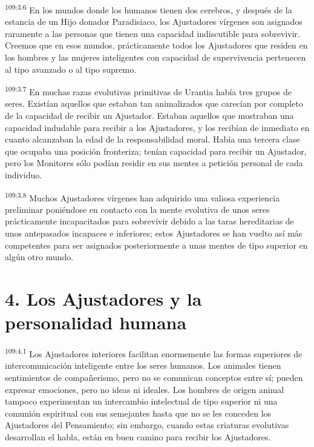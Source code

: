 \par
\textsuperscript{109:3.6} En los mundos donde los humanos tienen dos cerebros, y después de la estancia de un Hijo donador Paradisiaco, los Ajustadores vírgenes son asignados raramente a las personas que tienen una capacidad indiscutible para sobrevivir. Creemos que en esos mundos, prácticamente todos los Ajustadores que residen en los hombres y las mujeres inteligentes con capacidad de supervivencia pertenecen al tipo avanzado o al tipo supremo.

\par
\textsuperscript{109:3.7} En muchas razas evolutivas primitivas de Urantia había tres grupos de seres. Existían aquellos que estaban tan animalizados que carecían por completo de la capacidad de recibir un Ajustador. Estaban aquellos que mostraban una capacidad indudable para recibir a los Ajustadores, y los recibían de inmediato en cuanto alcanzaban la edad de la responsabilidad moral. Había una tercera clase que ocupaba una posición fronteriza; tenían capacidad para recibir un Ajustador, pero los Monitores sólo podían residir en sus mentes a petición personal de cada individuo.

\par
\textsuperscript{109:3.8} Muchos Ajustadores vírgenes han adquirido una valiosa experiencia preliminar poniéndose en contacto con la mente evolutiva de unos seres prácticamente incapacitados para sobrevivir debido a las taras hereditarias de unos antepasados incapaces e inferiores; estos Ajustadores se han vuelto así más competentes para ser asignados posteriormente a unas mentes de tipo superior en algún otro mundo.

\section*{4. Los Ajustadores y la personalidad humana}
\par
\textsuperscript{109:4.1} Los Ajustadores interiores facilitan enormemente las formas superiores de intercomunicación inteligente entre los seres humanos. Los animales tienen sentimientos de compañerismo, pero no se comunican conceptos entre sí; pueden expresar emociones, pero no ideas ni ideales. Los hombres de origen animal tampoco experimentan un intercambio intelectual de tipo superior ni una comunión espiritual con sus semejantes hasta que no se les conceden los Ajustadores del Pensamiento; sin embargo, cuando estas criaturas evolutivas desarrollan el habla, están en buen camino para recibir los Ajustadores.

